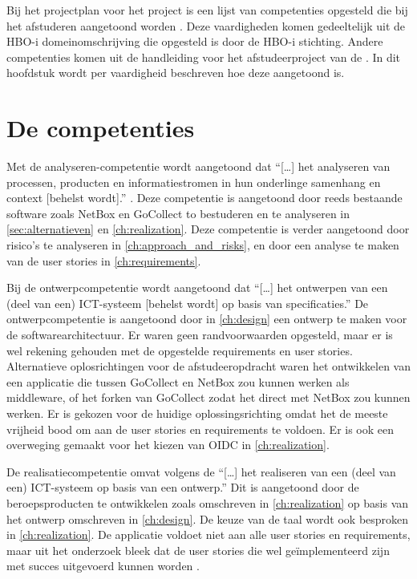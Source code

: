 \documentclass[../report.tex]{subfiles}
\begin{document}
Bij het projectplan voor het project is een lijst van competenties opgesteld die bij het afstuderen aangetoond worden \parencite{projectplan}. Deze vaardigheden komen gedeeltelijk uit de HBO-i domeinomschrijving die opgesteld is door de HBO-i stichting. Andere competenties komen uit de handleiding voor het afstudeerproject van de \textcite{handleiding_afstudeerproject}. In dit hoofdstuk wordt per vaardigheid beschreven hoe deze aangetoond is.

\section{De competenties}

Met de analyseren-competentie wordt aangetoond dat ``[\dots] het analyseren van processen, producten en informatiestromen in hun onderlinge samenhang en context [behelst wordt].'' \parencite{hbo_i}. Deze competentie is aangetoond door reeds bestaande software zoals NetBox en GoCollect to bestuderen en te analyseren in \autoref{sec:alternatieven} en \autoref{ch:realization}. Deze competentie is verder aangetoond door risico's te analyseren in \autoref{ch:approach_and_risks}, en door een analyse te maken van de user stories in \autoref{ch:requirements}.

Bij de ontwerpcompetentie wordt aangetoond dat ``[\dots] het ontwerpen van een (deel van een) ICT-systeem [behelst wordt] op basis van specificaties.'' \parencite{hbo_i} De ontwerpcompetentie is aangetoond door in \autoref{ch:design} een ontwerp te maken voor de softwarearchitectuur. Er waren geen randvoorwaarden opgesteld, maar er is wel rekening gehouden met de opgestelde requirements en user stories. Alternatieve oplosrichtingen voor de afstudeeropdracht waren het ontwikkelen van een applicatie die tussen GoCollect en NetBox zou kunnen werken als middleware, of het forken van GoCollect zodat het direct met NetBox zou kunnen werken. Er is gekozen voor de huidige oplossingsrichting omdat het de meeste vrijheid bood om aan de user stories en requirements te voldoen. Er is ook een overweging gemaakt voor het kiezen van \gls*{OIDC} in \autoref{ch:realization}.

De realisatiecompetentie omvat volgens de \textcite{hbo_i} ``[\dots] het realiseren van een (deel van een) ICT-systeem op basis van een ontwerp.'' Dit is aangetoond door de beroepsproducten te ontwikkelen zoals omschreven in \autoref{ch:realization} op basis van het ontwerp omschreven in \autoref{ch:design}. De keuze van de taal wordt ook besproken in \autoref{ch:realization}. De applicatie voldoet niet aan alle user stories en requirements, maar uit het onderzoek bleek dat de user stories die wel geïmplementeerd zijn met succes uitgevoerd kunnen worden \parencite{research_report}.
\end{document}
